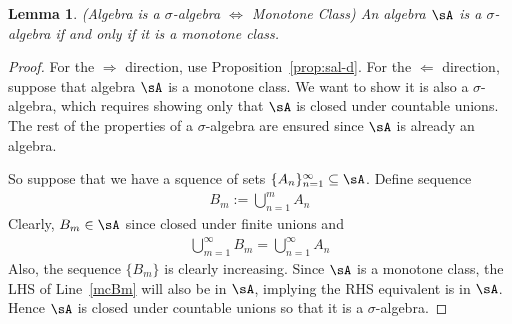 \documentclass[12pt]{article}
\theoremstyle{plain}
\newtheorem{lem}[thm]{Lemma}
\theoremstyle{definition}
\theoremstyle{remark}
\newcommand{\ninf}{_{n=1}^\infty}
\newcommand{\minf}{_{m=1}^\infty}
\begin{document}
\begin{lem}\emph{(Algebra is a $\sigma$-algebra $\iff$ Monotone Class)}
\label{lem:alg-sigal-mc}
An algebra $\sA$ is a $\sigma$-algebra if and only if it is a monotone
class.
\end{lem}
\begin{proof}
For the $\Rightarrow$ direction, use Proposition~\ref{prop:sal-d}.
For the $\Leftarrow$ direction, suppose that algebra $\sA$ is a
monotone class. We want to show it is also a $\sigma$-algebra, which
requires showing only that $\sA$ is closed under countable unions. The
rest of the properties of a $\sigma$-algebra are ensured since $\sA$ is
already an algebra.

So suppose that we have a squence of sets
$\{A_n\}\ninf\subseteq\sA$. Define sequence
\begin{align*}
  B_m := \bigcup_{n=1}^m A_n
\end{align*}
Clearly, $B_m \in \sA$ since closed under finite unions and
\begin{align}
  \bigcup\minf B_m = \bigcup\ninf A_n
  \label{mcBm}
\end{align}
Also, the sequence $\{B_m\}$ is clearly increasing. Since $\sA$ is a
monotone class, the LHS of Line~\ref{mcBm} will also be in $\sA$,
implying the RHS equivalent is in $\sA$. Hence $\sA$ is closed under
countable unions so that it is a $\sigma$-algebra.
\end{proof}
\end{document}
